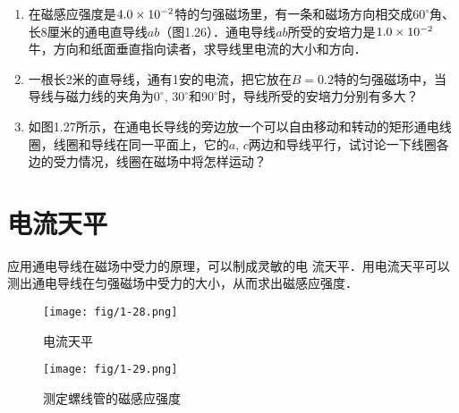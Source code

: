 \begin{enumerate}
\begin{figure}[htp]
\centering
\begin{minipage}[t]{0.48\textwidth}
\centering
{}
\caption{}
\end{minipage}
\begin{minipage}[t]{0.48\textwidth}
\centering
{}
\caption{}
\end{minipage}
\end{figure}



    \item 在磁感应强度是$4.0\times10^{-2}$特的匀强磁场里，有一条和磁场方向相交成$60^\circ$角、长8厘米的通电直导线$ab$（图1.26）．通电导线$ab$所受的安培力是$1.0\times10^{-2}$牛，方向和纸面垂直指向读者，求导线里电流的大小和方向．
    \item 一根长2米的直导线，通有1安的电流，把它放在$B=0.2$特的匀强磁场中，当导线与磁力线的夹角为$0^\circ$, $30^\circ$和$90^\circ$时，导线所受的安培力分别有多大？

    \item 如图1.27所示，在通电长导线的旁边放一个可以自由移动和转动的矩形通电线圈，线圈和导线在同一平面上，它的$a$, $c$两边和导线平行，试讨论一下线圈各边的受力情况，线圈在磁场中将怎样运动？
\end{enumerate}

\section{电流天平}
应用通电导线在磁场中受力的原理，可以制成灵敏的电
流天平．用电流天平可以测出通电导线在匀强磁场中受力的大小，从而求出磁感应强度．
    \begin{figure}[htp]\centering
	\texttt{[image: fig/1-28.png]}
	\caption{电流天平}
\end{figure}
    \begin{figure}[htp]\centering
	\texttt{[image: fig/1-29.png]}
	\caption{测定螺线管的磁感应强度}
\end{figure}

